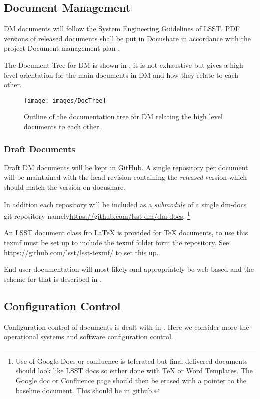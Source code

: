 \subsection {Document Management} \label{sect:docman}
DM documents will follow the System Engineering Guidelines of LSST. PDF versions of released documents shall be put in Docushare in accordance with the project Document management plan .

The Document Tree for DM is shown in , it is not exhaustive but gives a high level orientation for the main documents in DM and how they relate to each other.

\begin{figure}
\begin{center}
 \texttt{[image: images/DocTree]}
\caption{Outline of the documentation tree for DM relating the high level documents to each other. \label{fig:doctree}}
\end{center}
\end{figure}


\subsubsection{Draft Documents}
Draft DM documents will be kept in GitHub. A single repository per document will be maintained with the head revision containing the {\em released } version which should match the version on docushare. 

In addition each repository will be included as a {\em submodule} of a single dm-docs git repository namely\url{https://github.com/lsst-dm/dm-docs}. 
\footnote{Use of Google Docs or confluence is tolerated but final delivered documents should look like LSST docs so either done with TeX or Word Templates. The Google doc or Confluence page should then be erased with a pointer to the baseline document. This should be in github.}

An LSST document class fro LaTeX is provided for TeX documents, to use this texmf must be set up to include the texmf folder form the repository. See \url{https://github.com/lsst/lsst-texmf/} to set this up. 

End user documentation will most likely and appropriately be web based and the scheme for that is described in \citeyearpar{LDM-493}.


\subsection {Configuration Control } \label{sect:config}
Configuration control of documents is dealt with in . Here we consider more the operational systems and software configuration control. 
